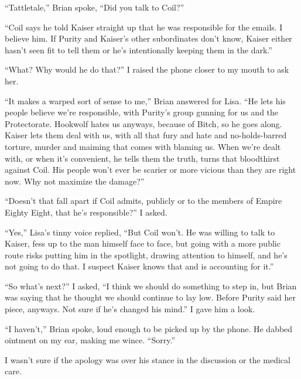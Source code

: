``Tattletale,'' Brian spoke, ``Did you talk to Coil?''



``Coil says he told Kaiser straight up that he was responsible for the emails.  I believe him.  If Purity and Kaiser's other subordinates don't know, Kaiser either hasn't seen fit to tell them or he's intentionally keeping them in the dark.''



``What?  Why would he do that?'' I raised the phone closer to my mouth to ask her.



``It makes a warped sort of sense to me,'' Brian answered for Lisa.  ``He lets his people believe we're responsible, with Purity's group gunning for us and the Protectorate.  Hookwolf hates us anyways, because of Bitch, so he goes along.  Kaiser lets them deal with us, with all that fury and hate and no-holds-barred torture, murder and maiming that comes with blaming us.  When we're dealt with, or when it's convenient, he tells them the truth, turns that bloodthirst against Coil.  His people won't ever be scarier or more vicious than they are right now.  Why not maximize the damage?''



``Doesn't that fall apart if Coil admits, publicly or to the members of Empire Eighty Eight, that he's responsible?''  I asked.



``Yes,'' Lisa's tinny voice replied, ``But Coil won't.  He was willing to talk to Kaiser, fess up to the man himself face to face, but going with a more public route risks putting him in the spotlight, drawing attention to himself, and he's not going to do that.  I suspect Kaiser knows that and is accounting for it.''



``So what's next?'' I asked, ``I think we should do something to step in, but Brian was saying that he thought we should continue to lay low.  Before Purity said her piece, anyways. Not sure if he's changed his mind.''  I gave him a look.



``I haven't,'' Brian spoke, loud enough to be picked up by the phone.  He dabbed ointment on my ear, making me wince.  ``Sorry.''



I wasn't sure if the apology was over his stance in the discussion or the medical care.



